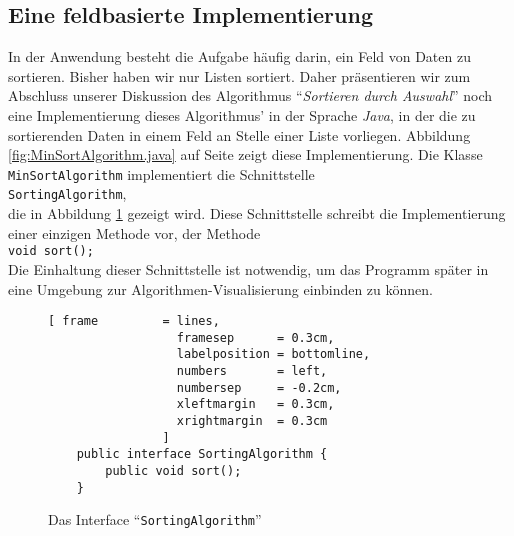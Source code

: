 \subsection{Eine feldbasierte Implementierung}
In der Anwendung besteht die Aufgabe h\"aufig darin, ein Feld von Daten zu sortieren.
Bisher haben wir nur Listen sortiert.  Daher pr\"asentieren wir
zum Abschluss unserer Diskussion des Algorithmus ``\emph{Sortieren durch Auswahl}''
noch eine Implementierung dieses Algorithmus' in der Sprache \textsl{Java},
in der die zu sortierenden Daten in einem Feld an Stelle einer Liste vorliegen.
Abbildung \ref{fig:MinSortAlgorithm.java} auf Seite \pageref{fig:MinSortAlgorithm.java} zeigt
diese Implementierung.  Die Klasse \texttt{MinSortAlgorithm} implementiert die
Schnittstelle \\[0.2cm]
\hspace*{1.3cm} \texttt{SortingAlgorithm}, \\[0.2cm]
die in Abbildung
\ref{fig:SortingAlgorithm.java} gezeigt wird.  Diese Schnittstelle schreibt die
Implementierung einer einzigen Methode vor, der Methode \\[0.2cm]
\hspace*{1.3cm} \texttt{void sort();} \\[0.2cm]
Die Einhaltung dieser Schnittstelle ist notwendig, um das Programm sp\"ater in eine Umgebung
zur Algorithmen-Visualisierung einbinden zu k\"onnen.

\begin{figure}[!ht]
  \centering
\begin{Verbatim}[ frame         = lines, 
                  framesep      = 0.3cm, 
                  labelposition = bottomline,
                  numbers       = left,
                  numbersep     = -0.2cm,
                  xleftmargin   = 0.3cm,
                  xrightmargin  = 0.3cm
                ]
    public interface SortingAlgorithm {
        public void sort();
    }
\end{Verbatim}
\vspace*{-0.3cm}
  \caption{Das Interface ``\texttt{SortingAlgorithm}''}
  \label{fig:SortingAlgorithm.java}
\end{figure}


